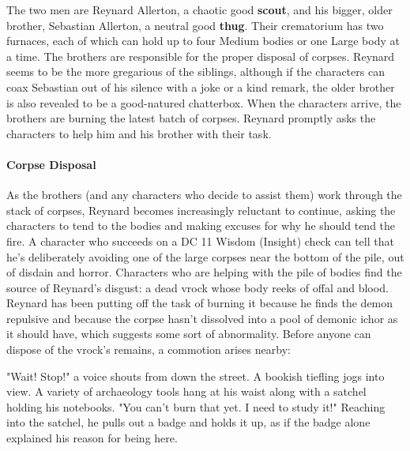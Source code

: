 \documentclass[10pt,a4,twoside,twocolumn,openany,nodeprecatedcode]{dndbook}
\begin{document}
The two men are Reynard Allerton, a chaotic good \textbf{scout}, and his bigger, older brother, Sebastian Allerton, a neutral good \textbf{thug}. Their crematorium has two furnaces, each of which can hold up to four Medium bodies or one Large body at a time. The brothers are responsible for the proper disposal of corpses. Reynard seems to be the more gregarious of the siblings, although if the characters can coax Sebastian out of his silence with a joke or a kind remark, the older brother is also revealed to be a good-natured chatterbox.
When the characters arrive, the brothers are burning the latest batch of corpses. Reynard promptly asks the characters to help him and his brother with their task.
\paragraph{Corpse Disposal}
As the brothers (and any characters who decide to assist them) work through the stack of corpses, Reynard becomes increasingly reluctant to continue, asking the characters to tend to the bodies and making excuses for why he should tend the fire. A character who succeeds on a DC 11 Wisdom (Insight) check can tell that he's deliberately avoiding one of the large corpses near the bottom of the pile, out of disdain and horror.
Characters who are helping with the pile of bodies find the source of Reynard's disgust: a dead vrock whose body reeks of offal and blood. Reynard has been putting off the task of burning it because he finds the demon repulsive and because the corpse hasn't dissolved into a pool of demonic ichor as it should have, which suggests some sort of abnormality.
Before anyone can dispose of the vrock's remains, a commotion arises nearby:
\begin{DndReadAloud}{}
"Wait! Stop!" a voice shouts from down the street. A bookish tiefling jogs into view. A variety of archaeology tools hang at his waist along with a satchel holding his notebooks. "You can't burn that yet. I need to study it!" Reaching into the satchel, he pulls out a badge and holds it up, as if the badge alone explained his reason for being here.
\end{DndReadAloud}
\end{document}
